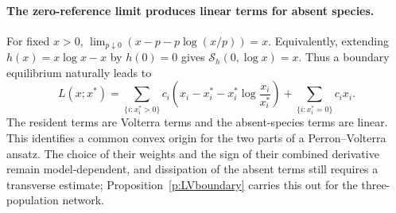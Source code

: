 \paragraph{The zero-reference limit produces linear terms for absent species.}
For fixed $x>0$, $\lim_{p\downarrow0}(x-p-p\log(x/p))=x$. Equivalently, extending $h(x)=x\log x-x$
by $h(0)=0$ gives $\mathcal S_h(0,\log x)=x$. Thus a boundary equilibrium naturally leads to
\[
 L(x;x^*)=\sum_{\{i:x_i^*>0\}}c_i\left(x_i-x_i^*-x_i^*\log\frac{x_i}{x_i^*}\right)
 +\sum_{\{i:x_i^*=0\}}c_ix_i.
\]
The resident terms are Volterra terms and the absent-species terms are linear. This identifies a
common convex origin for the two parts of a Perron--Volterra
ansatz. The choice of their weights and the sign of their
combined derivative remain model-dependent, and dissipation of the absent terms still requires a
transverse estimate; Proposition~\ref{p:LVboundary} carries this out for the three-population network.
